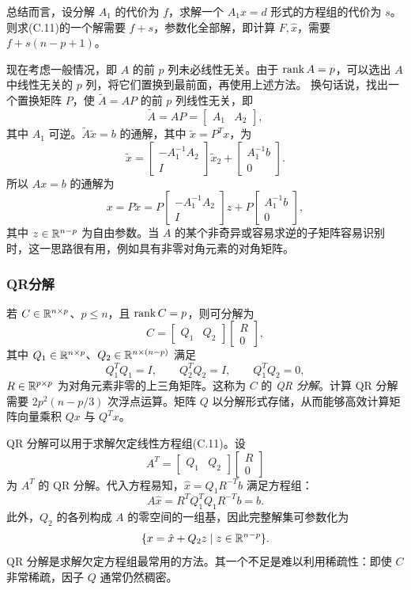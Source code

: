 总结而言，设分解 $A_1$ 的代价为 $f$，求解一个 $A_1x=d$ 形式的方程组的代价为 $s$。则求(C.11)的一个解需要 $f+s$，参数化全部解，即计算 $F,\hat x$，需要 $f+s(n-p+1)$。

现在考虑一般情况，即 $A$ 的前 $p$ 列未必线性无关。由于 $\operatorname{rank} A=p$，可以选出 $A$ 中线性无关的 $p$ 列，将它们置换到最前面，再使用上述方法。
换句话说，找出一个置换矩阵 $P$，使 $\widetilde A=AP$ 的前 $p$ 列线性无关，即
\[
 \widetilde A=AP=\begin{bmatrix}A_1&A_2\end{bmatrix},
\]
其中 $A_1$ 可逆。$\widetilde A\widetilde x=b$ 的通解，其中 $\widetilde x=P^Tx$，为
\[
 \widetilde x=\begin{bmatrix}-A_1^{-1}A_2\\I\end{bmatrix}\widetilde x_2
 +\begin{bmatrix}A_1^{-1}b\\0\end{bmatrix}.
\]
所以 $Ax=b$ 的通解为
\[
 x=P\widetilde x=P\begin{bmatrix}-A_1^{-1}A_2\\I\end{bmatrix}z
 +P\begin{bmatrix}A_1^{-1}b\\0\end{bmatrix},
\]
其中 $z\in\mathbb R^{n-p}$ 为自由参数。当 $A$ 的某个非奇异或容易求逆的子矩阵容易识别时，这一思路很有用，例如具有非零对角元素的对角矩阵。

\subsubsection*{QR分解}
若 $C\in\mathbb R^{n\times p}$、$p\leq n$，且 $\operatorname{rank} C=p$，则可分解为
\[
 C=\begin{bmatrix}Q_1&Q_2\end{bmatrix}\begin{bmatrix}R\\0\end{bmatrix},
\]
其中 $Q_1\in\mathbb R^{n\times p}$、$Q_2\in\mathbb R^{n\times(n-p)}$ 满足
\[
 Q_1^TQ_1=I,\qquad Q_2^TQ_2=I,\qquad Q_1^TQ_2=0,
\]
$R\in\mathbb R^{p\times p}$ 为对角元素非零的上三角矩阵。这称为 $C$ 的 \emph{QR 分解}。计算 QR 分解需要 $2p^2(n-p/3)$ 次浮点运算。矩阵 $Q$ 以分解形式存储，从而能够高效计算矩阵向量乘积 $Qx$ 与 $Q^Tx$。

QR 分解可以用于求解欠定线性方程组(C.11)。设
\[
 A^T=\begin{bmatrix}Q_1&Q_2\end{bmatrix}\begin{bmatrix}R\\0\end{bmatrix}
\]
为 $A^T$ 的 QR 分解。代入方程易知，$\hat x=Q_1R^{-T}b$ 满足方程组：
\[
 A\hat x=R^TQ_1^TQ_1R^{-T}b=b.
\]
此外，$Q_2$ 的各列构成 $A$ 的零空间的一组基，因此完整解集可参数化为
\[
 \{x=\hat x+Q_2z\mid z\in\mathbb R^{n-p}\}.
\]
QR 分解是求解欠定方程组最常用的方法。其一个不足是难以利用稀疏性：即使 $C$ 非常稀疏，因子 $Q$ 通常仍然稠密。

